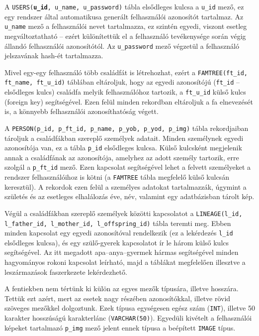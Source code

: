 A \texttt{USERS(\textbf{u\_id}, u\_name, u\_password)} tábla elsődleges kulcsa a \texttt{u\_id} mező, ez egy rendszer által automatikusa generált felhasználói azonosítót tartalmaz. Az \texttt{u\_name} mező a felhasználói nevet tartalmazza, ez szintén egyedi, viszont esetleg megváltoztatható -- ezért különítettük el a felhasználó tevékenysége során végig állandó felhasználói azonosítótól. Az \texttt{u\_password} mező végzetül a felhasználó jelszavának hash-ét tartalmazza.

Mivel egy-egy felhasználó több családfát is létrehozhat, ezért a \texttt{FAMTREE(ft\_id, ft\_name, ft\_u\_id)} táblában eltároljuk, hogy az egyedi azonosítójú (\texttt{ft\_id} -- elsődleges kulcs) családfa melyik felhasználóhoz tartozik, a \texttt{ft\_u\_id} külső kulcs (foreign key) segítségével. Ezen felül minden rekordban eltároljuk a fa elnevezését is, a könnyebb felhasználói azonosíthatóság végett.

A \texttt{PERSON(p\_id, p\_ft\_id, p\_name, p\_yob, p\_yod, p\_img)} tábla rekordjaiban tároljuk a családfákban szereplő személyek adatait. Minden személynek egyedi azonosítója van, ez a tábla \texttt{p\_id} elsődleges kulcsa. Külső kulcsként megjelenik annak a családfának az azonosítója, amelyhez az adott személy tartozik, erre szolgál a \texttt{p\_ft\_id} mező. Ezen kapcsolat segítségével lehet a felvett személyeket a rendszer felhasználóihoz is kötni (a \texttt{FAMTREE} tábla megfelelő külső kulcsán keresztül). A rekordok ezen felül a személyes adatokat tartalmazzák, úgymint a születés és az esetleges elhalálozás éve, név, valamint egy adatbázisban tárolt kép.

Végül a családfákban szereplő személyek közötti kapcsolatot a \texttt{LINEAGE(l\_id, l\_father\_id, l\_mother\_id, l\_offspring\_id)} tábla teremti meg. Ebben minden kapcsolat egy egyedi azonosítóval rendelkezik (ez a lekérdezés \texttt{l\_id} elsődleges kulcsa), és egy szülő-gyerek kapcsolatot ír le három külső kulcs segítségével. Az itt megadott apa--anya--gyermek hármas segítségével minden hagyományos rokoni kapcsolat leírható, majd a táblákat megfelelően illesztve a leszármazások faszerkezete lekérdezhető.

\bigskip

A fentiekben nem tértünk ki külön az egyes mezők típusára, illetve hosszára. Tettük ezt azért, mert az esetek nagy részében azonosítókkal, illetve rövid szöveges mezőkkel dolgoztunk. Ezek típusa egységesen egész szám (\texttt{INT}), illetve 50 karakter hosszúságú karakterlánc (\texttt{VARCHAR(50)}). Egyedüli kivételt a felhasználói képeket tartalmazó \texttt{p\_img} mező jelent ennek típusa a beépített \texttt{IMAGE} típus.

